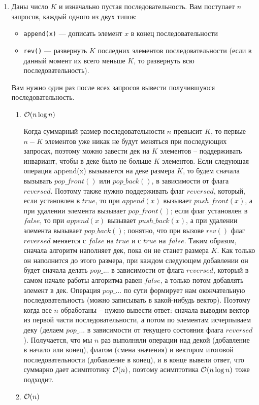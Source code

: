 \begin{enumerate}
  \item
    Даны число $K$ и изначально пустая последовательность. Вам поступает $n$ запросов, каждый одного из двух типов:
    \begin{itemize}
      \item \texttt{append(x)} --- дописать элемент $x$ в конец последовательности
      \item \texttt{rev()} ---
        развернуть $K$ последних элементов последовательности (если в данный момент их всего меньше $K$, то
        развернуть всю последовательность).
    \end{itemize}
    Вам нужно один раз после всех запросов вывести получившуюся последовательность.
    \begin{enumerate}
      \item $\mathcal{O}(n \log{n})$
      \begin{solution}
        Когда суммарный размер последовательности $n$ превысит $K$, то первые $n-K$ элементов уже никак не будут меняться при последующих запросах, поэтому можно завести дек на $K$ элементов -- поддерживать инвариант, чтобы в деке было не больше $K$ элементов. Если следующая операция append(x) вызывается на деке размера $K$, то будем сначала вызывать $pop\_front()$ или $pop\_back()$, в зависимости от флага $reversed$. Поэтому также нужно поддерживать флаг $reversed$, который, если установлен в $true$, то при $append(x)$ вызывает $push\_front(x)$, а при удалении элемента вызывает $pop\_front()$; если флаг установлен в $false$, то при $append(x)$ вызывает $push\_back(x)$, а при удалении элемента вызывает $pop\_back()$; понятно, что при вызове $rev()$ флаг $reversed$ меняется с $false$ на $true$ и с $true$ на $false$. Таким образом, сначала алгоритм наполняет дек, пока он не станет размера $K$. Как только он наполнится до этого размера, при каждом следующем добавлении он будет сначала делать $pop\_...$ в зависимости от флага $reversed$, который в самом начале работы алгоритма равен $false$, а только потом добавлять элемент в дек. Операция $pop\_...$ по сути формирует нам окончательную последовательность (можно записывать в какой-нибудь вектор). Поэтому когда все $n$ обработаны -- нужно вывести ответ: сначала выводим вектор из первой части последовательности, а потом по элементам исчерпываем деку (делаем $pop\_...$ в зависимости от текущего состояния флага $reversed$). Получается, что мы $n$ раз выполняли операции над декой (добавление в начало или конец), флагом (смена значения) и вектором итоговой последовательности (добавление в конец), и в конце вывели ответ, что суммарно дает асимптотику $\mathcal{O}(n)$, поэтому асимптотика $\mathcal{O}(n \log n)$ тоже подходит.
      \end{solution}
      \item $\mathcal{O}(n)$
    \end{enumerate}


\end{enumerate}
